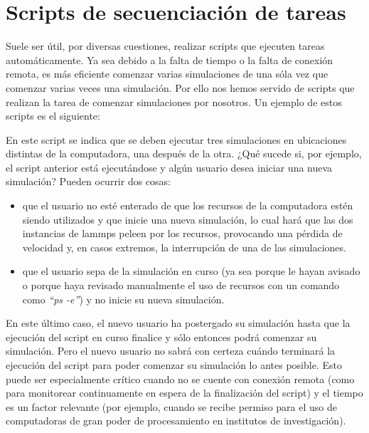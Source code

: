 \label{AD} %


\section{Scripts de secuenciación de tareas}

Suele ser útil, por diversas cuestiones, realizar scripts que ejecuten tareas automáticamente. Ya sea debido a la falta de tiempo o la falta de conexión remota, es más eficiente comenzar varias simulaciones de una sóla vez que comenzar varias veces una simulación. Por ello nos hemos servido de scripts que realizan la tarea de comenzar simulaciones por nosotros. Un ejemplo de estos scripts es el siguiente:



En este script se indica que se deben ejecutar tres simulaciones en ubicaciones distintas de la computadora, una después de la otra. ¿Qué sucede si, por ejemplo, el script anterior está ejecutándose y algún usuario desea iniciar una nueva simulación? Pueden ocurrir dos cosas:

\begin{itemize}
 \item que el usuario no esté enterado de que los recursos de la computadora estén siendo utilizados y que inicie una nueva simulación, lo cual hará que las dos instancias de lammps peleen por los recursos, provocando una pérdida de velocidad y, en casos extremos, la interrupción de una de las simulaciones.
 \item que el usuario sepa de la simulación en curso (ya sea porque le hayan avisado o porque haya revisado manualmente el uso de recursos con un comando como \textit{``ps -e''}) y no inicie su nueva simulación.
\end{itemize}

En este último caso, el nuevo usuario ha postergado su simulación hasta que la ejecución del script en curso finalice y sólo entonces podrá comenzar su simulación. Pero el nuevo usuario no sabrá con certeza cuándo terminará la ejecución del script para poder comenzar su simulación lo antes posible. Esto puede ser especialmente crítico cuando no se cuente con conexión remota (como para monitorear continuamente en espera de la finalización del script) y el tiempo es un factor relevante (por ejemplo, cuando se recibe permiso para el uso de computadoras de gran poder de procesamiento en institutos de investigación).

